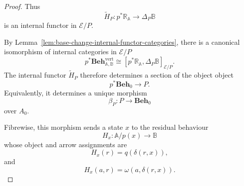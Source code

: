 \begin{proof}
    Thus
    \[
        \widetilde H_P:
        p^*\mathbb R_{\mathbb A}
        \longrightarrow
        \Delta_P\mathbb B
    \]
    is an internal functor in \(\mathcal E/P\).

    By Lemma~\ref{lem:base-change-internal-functor-categories}, there is a
    canonical isomorphism of internal categories in \(\mathcal E/P\)
    \[
        p^*
        \mathbf{Beh}^{\mathrm{vert}}_{\mathbb A,\mathbb B}
        \cong
        [p^*\mathbb R_{\mathbb A},
         \Delta_P\mathbb B]_{\mathcal E/P}.
    \]
    The internal functor \(\widetilde H_P\) therefore determines a section of
    the object object
    \[
        p^*\mathbf{Beh}_0\to P.
    \]
    Equivalently, it determines a unique morphism
    \[
        \beta_P:P\to\mathbf{Beh}_0
    \]
    over \(A_0\).

    Fibrewise, this morphism sends a state \(x\) to the residual behaviour
    \[
        H_x:\mathbb A/p(x)\to\mathbb B
    \]
    whose object and arrow assignments are
    \[
        H_x(r)=q(\delta(r,x)),
    \]
    and
    \[
        H_x(a,r)=\omega(a,\delta(r,x)).
    \]
\end{proof}


